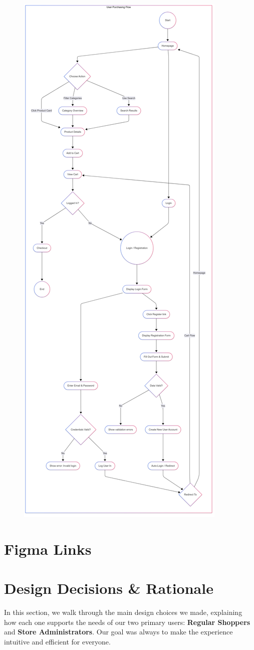 \documentclass[11pt,a4paper]{article}
\begin{document}
	\begin{figure}[h]
		\centering
		\includegraphics[width=0.42\linewidth]{pictures/main/UserFlow.png}
		\label{fig:figure17}
	\end{figure}
		\newpage

	\section{Figma Links}\label{sec:figma_linkss}
	
	
	
\section{Design Decisions \& Rationale}

In this section, we walk through the main design choices we made, explaining how each one supports the needs of our two primary users: \textbf{Regular Shoppers} and \textbf{Store Administrators}. Our goal was always to make the experience intuitive and efficient for everyone.
\end{document}
